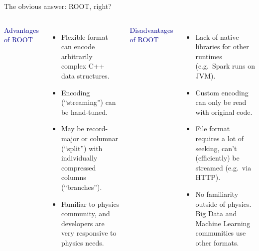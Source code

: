 \documentclass{beamer}
\begin{document}
\begin{frame}{The obvious answer: ROOT, right?}
\vspace{0.25 cm}
\begin{columns}[t]
\textcolor{darkblue}{Advantages of ROOT}

\begin{itemize}
\item Flexible format can encode arbitrarily complex C++ data structures.

\item Encoding (``streaming'') can be hand-tuned.

\item May be record-major or columnar (``split'') with individually compressed columns (``branches'').

\item Familiar to physics community, and developers are very responsive to physics needs.

\end{itemize}

\textcolor{darkblue}{Disadvantages of ROOT}

\begin{itemize}
\item Lack of native libraries for other runtimes (e.g.\ Spark runs on JVM).

\item Custom encoding can only be read with original code.

\item File format requires a lot of seeking, can't (efficiently) be streamed (e.g.\ via HTTP).

\item No familiarity outside of physics. Big Data and Machine Learning communities use other formats.
\end{itemize}
\end{columns}
\end{frame}
\end{document}
